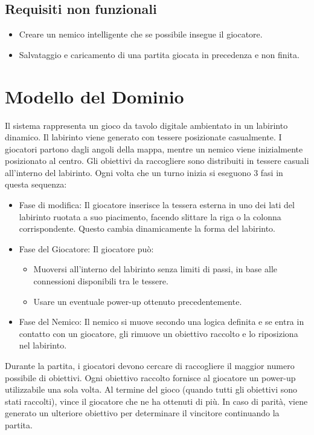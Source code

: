 \documentclass[a4paper,12pt]{report}
\begin{document}
\subsection*{Requisiti non funzionali}
\begin{itemize}
	\item Creare un nemico intelligente che se possibile insegue il giocatore.
	\item Salvataggio e caricamento di una partita giocata in precedenza e non finita.
\end{itemize}

\section{Modello del Dominio}

Il sistema rappresenta un gioco da tavolo digitale ambientato in un labirinto dinamico. Il labirinto viene generato con tessere posizionate casualmente. 
I giocatori partono dagli angoli della mappa, mentre un nemico viene inizialmente posizionato al centro. 
Gli obiettivi da raccogliere sono distribuiti in tessere casuali all'interno del labirinto.
Ogni volta che un turno inizia si eseguono 3 fasi in questa sequenza:
\begin{itemize}
	\item Fase di modifica: Il giocatore inserisce la tessera esterna in uno dei lati del labirinto ruotata a suo piacimento, facendo slittare la riga o la colonna corrispondente. Questo cambia dinamicamente la forma del labirinto.
	\item Fase del Giocatore: Il giocatore può:
	\begin{itemize}
		\item Muoversi all’interno del labirinto senza limiti di passi, in base alle connessioni disponibili tra le tessere.
		\item Usare un eventuale power-up ottenuto precedentemente.
	\end{itemize}
	\item Fase del Nemico: Il nemico si muove secondo una logica definita e se entra in contatto con un giocatore, gli rimuove un obiettivo raccolto e lo riposiziona nel labirinto.
\end{itemize}
Durante la partita, i giocatori devono cercare di raccogliere il maggior numero possibile di obiettivi. Ogni obiettivo raccolto fornisce al giocatore un power-up utilizzabile una sola volta.
Al termine del gioco (quando tutti gli obiettivi sono stati raccolti), vince il giocatore che ne ha ottenuti di più.
In caso di parità, viene generato un ulteriore obiettivo per determinare il vincitore continuando la partita.
\end{document}
